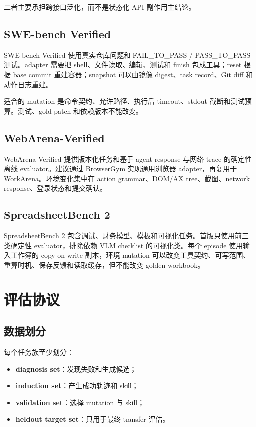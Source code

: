 \documentclass[11pt,a4paper,fontset=fandol]{ctexart}
\begin{document}
二者主要承担跨接口泛化，而不是状态化 API 副作用主结论。

\subsection{SWE-bench Verified}

SWE-bench Verified 使用真实仓库问题和 FAIL\_TO\_PASS / PASS\_TO\_PASS 测试\cite{swebench}。adapter 需要把 shell、文件读取、编辑、测试和 finish 包成工具；reset 根据 base commit 重建容器；snapshot 可以由镜像 digest、task record、Git diff 和动作日志重建。

适合的 mutation 是命令契约、允许路径、执行后 timeout、stdout 截断和测试预算。测试、gold patch 和依赖版本不能改变。

\subsection{WebArena-Verified}

WebArena-Verified 提供版本化任务和基于 agent response 与网络 trace 的确定性离线 evaluator\cite{webarenaverified}。建议通过 BrowserGym 实现通用浏览器 adapter，再复用于 WorkArena。环境变化集中在 action grammar、DOM/AX tree、截图、network response、登录状态和提交确认。

\subsection{SpreadsheetBench 2}

SpreadsheetBench 2 包含调试、财务模型、模板和可视化任务\cite{spreadsheetbench2}。首版只使用前三类确定性 evaluator，排除依赖 VLM checklist 的可视化类。每个 episode 使用输入工作簿的 copy-on-write 副本，环境 mutation 可以改变工具契约、可写范围、重算时机、保存反馈和读取缓存，但不能改变 golden workbook。

\section{评估协议}

\subsection{数据划分}

每个任务族至少划分：

\begin{itemize}
  \item \textbf{diagnosis set}：发现失败和生成候选；
  \item \textbf{induction set}：产生成功轨迹和 skill；
  \item \textbf{validation set}：选择 mutation 与 skill；
  \item \textbf{heldout target set}：只用于最终 transfer 评估。
\end{itemize}
\end{document}
